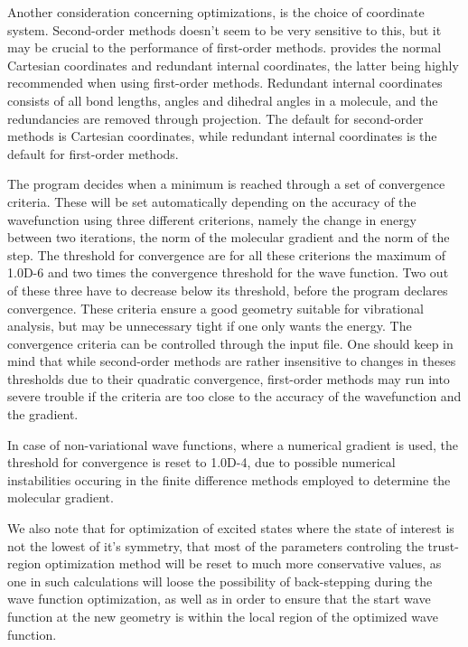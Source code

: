 Another consideration concerning optimizations, is the choice of
coordinate system. Second-order methods doesn't seem to be very
sensitive to this, but it may be crucial to the performance of
first-order methods. {\siraba} provides the normal Cartesian
coordinates and redundant internal
coordinates, the latter being 
highly recommended when using first-order methods. Redundant internal
coordinates consists of all bond lengths, angles and dihedral angles
in a molecule, and the redundancies are removed through
projection. The default for second-order methods is Cartesian
coordinates, while redundant internal coordinates is the default for
first-order methods.

The program decides when a minimum is reached through a set of
convergence criteria. These will be set
automatically depending on the 
accuracy of the wavefunction using three different criterions, namely
the change in energy between two iterations, the norm of the molecular
gradient and the norm of the step. The threshold for convergence are 
for all these criterions the maximum of 1.0D-6 and two times the
convergence threshold for the wave function. Two out
of these three have to decrease below its threshold, before the program
declares convergence. These criteria ensure a good geometry suitable
for vibrational analysis, but may be unnecessary tight if one only
wants the energy. The convergence criteria can be controlled through
the input file. One should keep in mind that while second-order
methods are rather insensitive to changes in theses thresholds due to
their quadratic convergence, first-order methods may run into severe
trouble if the criteria are too close to the accuracy of the wavefunction
and the gradient. 

In case of non-variational wave
functions, where a numerical gradient 
is used, the threshold for convergence is reset to 1.0D-4, due to
possible numerical instabilities occuring in the finite
difference methods employed to determine the
molecular gradient. 

We also note that for optimization of excited states where the state 
of interest is not the lowest of it's symmetry, that most of the
parameters controling the trust-region optimization method will be
reset to much more conservative values, as one in such calculations
will loose the possibility of back-stepping during the wave function
optimization, as well as in order to ensure that the start wave
function at the new geometry is within the local region of the
optimized wave function. 

